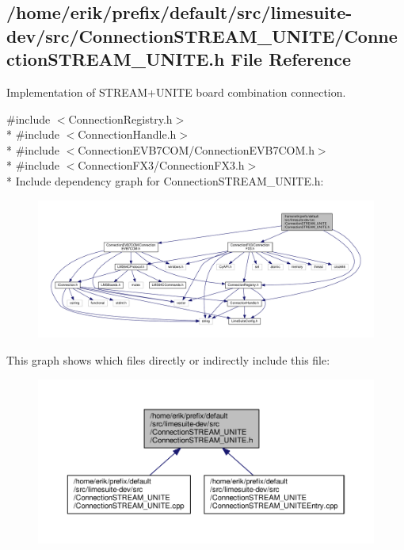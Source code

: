 \subsection{/home/erik/prefix/default/src/limesuite-\/dev/src/\+Connection\+S\+T\+R\+E\+A\+M\+\_\+\+U\+N\+I\+T\+E/\+Connection\+S\+T\+R\+E\+A\+M\+\_\+\+U\+N\+I\+TE.h File Reference}
\label{ConnectionSTREAM__UNITE_8h}


Implementation of S\+T\+R\+E\+A\+M+\+U\+N\+I\+TE board combination connection.  


{\ttfamily \#include $<$Connection\+Registry.\+h$>$}\\*
{\ttfamily \#include $<$Connection\+Handle.\+h$>$}\\*
{\ttfamily \#include $<$Connection\+E\+V\+B7\+C\+O\+M/\+Connection\+E\+V\+B7\+C\+O\+M.\+h$>$}\\*
{\ttfamily \#include $<$Connection\+F\+X3/\+Connection\+F\+X3.\+h$>$}\\*
Include dependency graph for Connection\+S\+T\+R\+E\+A\+M\+\_\+\+U\+N\+I\+T\+E.\+h\+:
\nopagebreak
\begin{figure}[H]
\begin{center}
\leavevmode
\includegraphics[width=350pt]{d8/d0a/ConnectionSTREAM__UNITE_8h__incl}
\end{center}
\end{figure}
This graph shows which files directly or indirectly include this file\+:
\nopagebreak
\begin{figure}[H]
\begin{center}
\leavevmode
\includegraphics[width=350pt]{d1/d3d/ConnectionSTREAM__UNITE_8h__dep__incl}
\end{center}
\end{figure}
